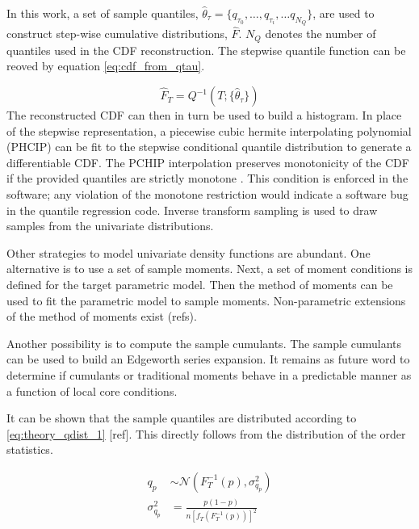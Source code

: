 In this work, a set of sample quantiles, $\hat \theta_\tau = \{q_{\tau_0}, \dots, q_{\tau_i}, \dots q_{N_Q} \}$, are used to construct step-wise cumulative distributions, $\hat F$.  $N_Q$ denotes the number of quantiles used in the CDF reconstruction. The stepwise quantile function can be reoved by equation \ref{eq:cdf_from_qtau}.

\begin{equation}
\hat F_{T}= Q^{-1}(T; \{\hat{\theta}_{\tau} \})
\label{eq:cdf_from_qtau}
\end{equation}
The reconstructed CDF can then in turn be used to build a histogram.  In place of the stepwise representation, a piecewise cubic hermite interpolating polynomial (PHCIP) can be fit to the stepwise conditional quantile distribution to generate a differentiable CDF.
The PCHIP interpolation preserves monotonicity of the CDF if the provided quantiles are strictly monotone \cite{Fritsch80}.  This condition is enforced in the software; any violation of the monotone restriction would indicate a software bug in the quantile regression code.  Inverse transform sampling is used to draw samples from the univariate distributions.

Other strategies to model univariate density functions are abundant.  One alternative is to use a set of sample moments.  Next, a set of moment conditions is defined for the target parametric model.  Then the method of moments can be used to fit the parametric model to sample moments.  Non-parametric extensions of the method of moments exist (refs).  

Another possibility is to compute the sample cumulants.  The sample cumulants can be used to build an Edgeworth series expansion. It remains as future word to determine if cumulants or traditional moments behave in a predictable manner as a function of local core conditions.
        
It can be shown that the sample quantiles are distributed according to \ref{eq:theory_qdist_1} [ref].  This directly follows from the distribution of the order statistics.

\begin{align}
    q_p &\sim \mathcal N \left( F_T^{-1}(p), \sigma^2_{q_p} \right) \nonumber \\
    \sigma^2_{q_p} &= \frac{p(1 - p)}{n[f_T(F_T^{-1}(p))]^2}
    \label{eq:theory_qdist_1}
\end{align}


